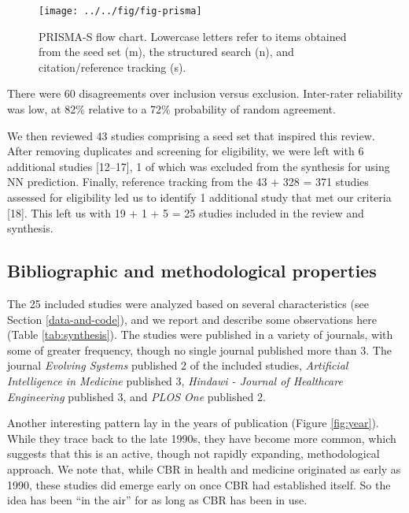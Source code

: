 \documentclass[preprint, 3p,
authoryear]{elsarticle} %
\begin{document}
\begin{figure}

{\centering \texttt{[image: ../../fig/fig-prisma]} 

}

\caption{PRISMA-S flow chart. Lowercase letters refer to items obtained from the seed set (m), the structured search (n), and citation/reference tracking (s).}\label{fig:prisma}
\end{figure}

There were 60 disagreements over inclusion versus exclusion. Inter-rater
reliability was low, at 82\% relative to a 72\% probability of random
agreement.

We then reviewed 43 studies comprising a seed set that inspired this
review. After removing duplicates and screening for eligibility, we were
left with 6 additional studies {[}12--17{]}, 1 of which was excluded
from the synthesis for using NN prediction. Finally, reference tracking
from the 43 + 328 = 371 studies assessed for eligibility led us to
identify 1 additional study that met our criteria {[}18{]}. This left us
with 19 + 1 + 5 = 25 studies included in the review and synthesis.

\hypertarget{bibliographic-and-methodological-properties}{%
\subsection{Bibliographic and methodological
properties}\label{bibliographic-and-methodological-properties}}

The 25 included studies were analyzed based on several characteristics
(see Section \ref{data-and-code}), and we report and describe some
observations here (Table \ref{tab:synthesis}). The studies were
published in a variety of journals, with some of greater frequency,
though no single journal published more than 3. The journal
\emph{Evolving Systems} published 2 of the included studies,
\emph{Artificial Intelligence in Medicine} published 3, \emph{Hindawi -
Journal of Healthcare Engineering} published 3, and \emph{PLOS One}
published 2.

Another interesting pattern lay in the years of publication (Figure
\ref{fig:year}). While they trace back to the late 1990s, they have
become more common, which suggests that this is an active, though not
rapidly expanding, methodological approach. We note that, while CBR in
health and medicine originated as early as 1990, these studies did
emerge early on once CBR had established itself. So the idea has been
``in the air'' for as long as CBR has been in use.
\end{document}
